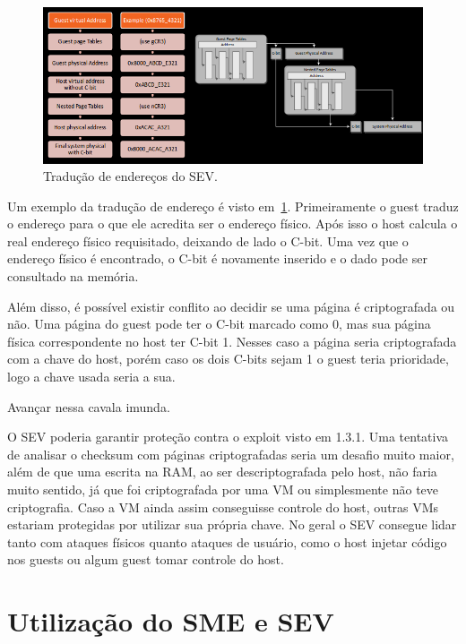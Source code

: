 \documentclass{report}
\newcommand{\todo}[1]{{\color{red} #1}}
\begin{document}
\begin{figure}[h]
    \centering
    \includegraphics[width=1\textwidth]{img/sev-address-translation}
    \caption{Tradução de endereços do SEV\@.}\label{sev-address-translation}
\end{figure}

Um exemplo da tradução de endereço é visto em~\ref{sev-address-translation}.
Primeiramente o guest traduz o endereço para o que ele acredita ser o endereço
físico. Após isso o host calcula o real endereço físico requisitado, deixando
de lado o C-bit. Uma vez que o endereço físico é encontrado, o C-bit é
novamente inserido e o dado pode ser consultado na memória.

Além disso, é possível existir conflito ao decidir se uma página é
criptografada ou não. Uma página do guest pode ter o C-bit marcado como 0, mas
sua página física correspondente no host ter C-bit 1. Nesses caso a página
seria criptografada com a chave do host, porém caso os dois C-bits sejam 1 o
guest teria prioridade, logo a chave usada seria a sua.

\todo{Avançar nessa cavala imunda.}

O SEV poderia garantir proteção contra o exploit visto em 1.3.1. Uma tentativa
de analisar o checksum com páginas criptografadas seria um desafio muito maior,
além de que uma escrita na RAM, ao ser descriptografada pelo host, não faria
muito sentido, já que foi criptografada por uma VM ou simplesmente não teve
criptografia. Caso a VM ainda assim conseguisse controle do host, outras VMs
estariam protegidas por utilizar sua própria chave. No geral o SEV consegue
lidar tanto com ataques físicos quanto ataques de usuário, como o host injetar
código nos guests ou algum guest tomar controle do host.

\section{Utilização do SME e SEV}
\end{document}
